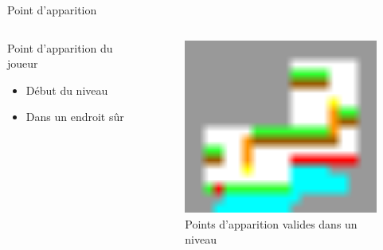 \documentclass{beamer}
\begin{document}
{\begin{frame}{Point d'apparition}
    \begin{columns}
        \begin{block}{Point d'apparition du joueur}
            \begin{itemize}
                \item[\bullet] Début du niveau
                \item[\bullet] Dans un endroit sûr
            \end{itemize}
        \end{block}
        \begin{figure}
            \centering
            \includegraphics[width=1.0\textwidth]{images/valid_spawn_locations}
            \caption{Points d'apparition valides dans un niveau}
        \end{figure}
    \end{columns}
\end{frame}

}
\end{document}
